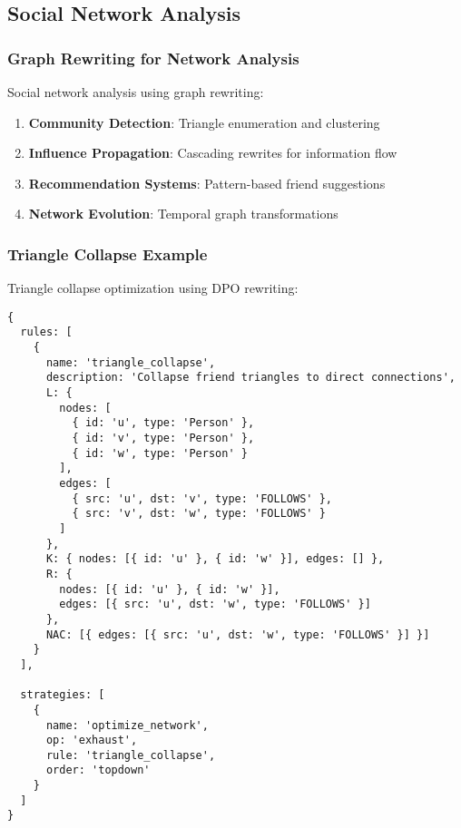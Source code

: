\documentclass[11pt,a4paper]{article}
\begin{document}
\subsection{Social Network Analysis}
\label{subsec:social_network}

\subsubsection{Graph Rewriting for Network Analysis}
\label{subsubsec:social_rewriting}

Social network analysis using graph rewriting:

\begin{enumerate}
\item \textbf{Community Detection}: Triangle enumeration and clustering
\item \textbf{Influence Propagation}: Cascading rewrites for information flow
\item \textbf{Recommendation Systems}: Pattern-based friend suggestions
\item \textbf{Network Evolution}: Temporal graph transformations
\end{enumerate}

\subsubsection{Triangle Collapse Example}
\label{subsubsec:triangle_example}

Triangle collapse optimization using DPO rewriting:

\begin{lstlisting}[language=jsonnet,caption=Triangle Collapse Rule]
{
  rules: [
    {
      name: 'triangle_collapse',
      description: 'Collapse friend triangles to direct connections',
      L: {
        nodes: [
          { id: 'u', type: 'Person' },
          { id: 'v', type: 'Person' },
          { id: 'w', type: 'Person' }
        ],
        edges: [
          { src: 'u', dst: 'v', type: 'FOLLOWS' },
          { src: 'v', dst: 'w', type: 'FOLLOWS' }
        ]
      },
      K: { nodes: [{ id: 'u' }, { id: 'w' }], edges: [] },
      R: {
        nodes: [{ id: 'u' }, { id: 'w' }],
        edges: [{ src: 'u', dst: 'w', type: 'FOLLOWS' }]
      },
      NAC: [{ edges: [{ src: 'u', dst: 'w', type: 'FOLLOWS' }] }]
    }
  ],

  strategies: [
    {
      name: 'optimize_network',
      op: 'exhaust',
      rule: 'triangle_collapse',
      order: 'topdown'
    }
  ]
}
\end{lstlisting}
\end{document}
